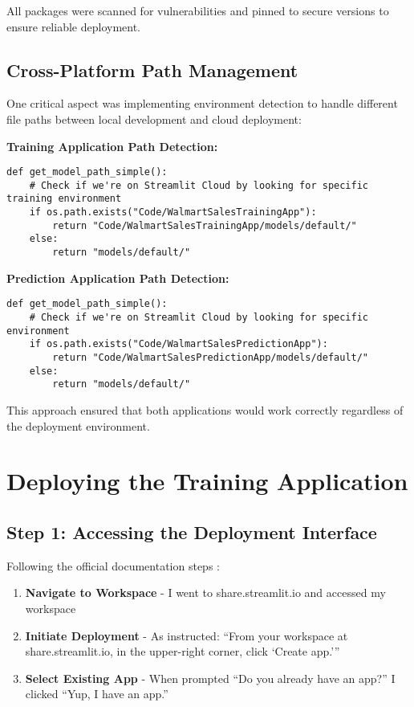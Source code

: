 All packages were scanned for vulnerabilities and pinned to secure versions to ensure reliable deployment.

\subsection{Cross-Platform Path Management}

One critical aspect was implementing environment detection to handle different file paths between local development and cloud deployment:

\textbf{Training Application Path Detection:}
\begin{verbatim}
def get_model_path_simple():
    # Check if we're on Streamlit Cloud by looking for specific training environment
    if os.path.exists("Code/WalmartSalesTrainingApp"):
        return "Code/WalmartSalesTrainingApp/models/default/"
    else:
        return "models/default/"
\end{verbatim}

\textbf{Prediction Application Path Detection:}
\begin{verbatim}
def get_model_path_simple():
    # Check if we're on Streamlit Cloud by looking for specific environment
    if os.path.exists("Code/WalmartSalesPredictionApp"):
        return "Code/WalmartSalesPredictionApp/models/default/"
    else:
        return "models/default/"
\end{verbatim}

This approach ensured that both applications would work correctly regardless of the deployment environment.

\section{Deploying the Training Application}

\subsection{Step 1: Accessing the Deployment Interface}

Following the official documentation steps \cite{Streamlit:2024deploy}:

\begin{enumerate}
\item \textbf{Navigate to Workspace} - I went to share.streamlit.io and accessed my workspace
\item \textbf{Initiate Deployment} - As instructed: ``From your workspace at share.streamlit.io, in the upper-right corner, click `Create app.'''
\item \textbf{Select Existing App} - When prompted ``Do you already have an app?'' I clicked ``Yup, I have an app.''
\end{enumerate}


